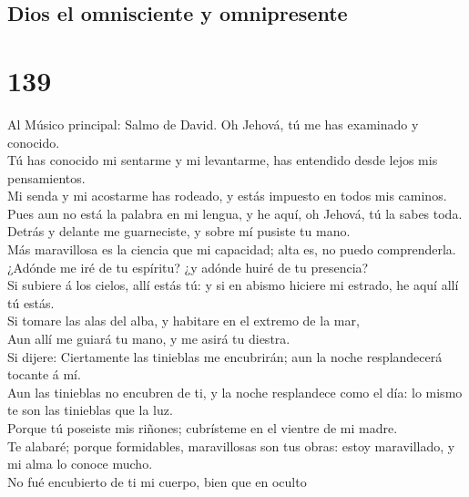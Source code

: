 \hypertarget{dios-el-omnisciente-y-omnipresente}{%
\subsection{Dios el omnisciente y
omnipresente}\label{dios-el-omnisciente-y-omnipresente}}

\hypertarget{section-19-139}{%
\section{139}\label{section-19-139}}

 Al Músico principal: Salmo de David. Oh Jehová, tú me has
examinado y conocido.\\
 Tú has conocido mi sentarme y mi levantarme, has
entendido desde lejos mis pensamientos.\\
 Mi senda y mi acostarme has rodeado, y estás impuesto en
todos mis caminos.\\
 Pues aun no está la palabra en mi lengua, y he aquí, oh
Jehová, tú la sabes toda.\\
 Detrás y delante me guarneciste, y sobre mí pusiste tu
mano.\\
 Más maravillosa es la ciencia que mi capacidad; alta es,
no puedo comprenderla.\\
 ¿Adónde me iré de tu espíritu? ¿y adónde huiré de tu
presencia?\\
 Si subiere á los cielos, allí estás tú: y si en abismo
hiciere mi estrado, he aquí allí tú estás.\\
 Si tomare las alas del alba, y habitare en el extremo de
la mar,\\
 Aun allí me guiará tu mano, y me asirá tu diestra.\\
 Si dijere: Ciertamente las tinieblas me encubrirán; aun
la noche resplandecerá tocante á mí.\\
 Aun las tinieblas no encubren de ti, y la noche
resplandece como el día: lo mismo te son las tinieblas que la luz.\\
 Porque tú poseiste mis riñones; cubrísteme en el vientre
de mi madre.\\
 Te alabaré; porque formidables, maravillosas son tus
obras: estoy maravillado, y mi alma lo conoce mucho.\\
 No fué encubierto de ti mi cuerpo, bien que en oculto
